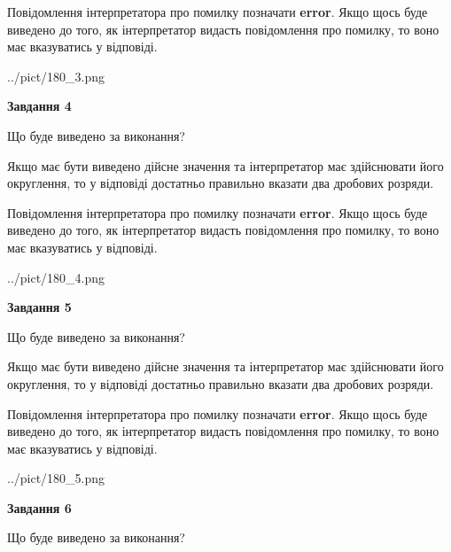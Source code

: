 \documentclass[12pt, ukrainian]{article}
\begin{document}
{\begin {Large}
Повідомлення інтерпретатора про помилку позначати \textbf{error}.
Якщо щось буде виведено до того, як інтерпретатор видасть повідомлення про помилку, 
то воно має вказуватись у відповіді. \par

\begin{center}
	{../pict/180_3.png}
\end{center}
\newpage

{\begin {center}\textbf{Завдання 4}\end {center}}\par
Що буде виведено за виконання? \par

Якщо має бути виведено дійсне значення та інтерпретатор має здійснювати його округлення, 
то у відповіді достатньо правильно вказати два дробових розряди.

Повідомлення інтерпретатора про помилку позначати \textbf{error}.
Якщо щось буде виведено до того, як інтерпретатор видасть повідомлення про помилку, 
то воно має вказуватись у відповіді. \par

\begin{center}
	{../pict/180_4.png}
\end{center}
\newpage

{\begin {center}\textbf{Завдання 5}\end {center}}\par
Що буде виведено за виконання? \par

Якщо має бути виведено дійсне значення та інтерпретатор має здійснювати його округлення, 
то у відповіді достатньо правильно вказати два дробових розряди.

Повідомлення інтерпретатора про помилку позначати \textbf{error}.
Якщо щось буде виведено до того, як інтерпретатор видасть повідомлення про помилку, 
то воно має вказуватись у відповіді. \par

\begin{center}
	{../pict/180_5.png}
\end{center}
\newpage

{\begin {center}\textbf{Завдання 6}\end {center}}\par
Що буде виведено за виконання? \par


\end{Large}}
\end{document}
